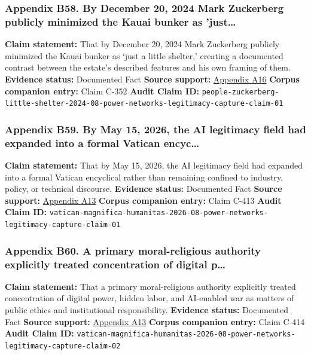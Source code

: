 \documentclass[
  american,
  11pt,
  letterpaper,
]{article}
\begin{document}
\subsubsection{Appendix B58. By December 20, 2024 Mark Zuckerberg
publicly minimized the Kauai bunker as
'just\ldots{}}\label{ch-08-appendix-b58-by-december-20-2024-mark-zuckerberg-publicly-minimized-the-kauai-bunker-as-just}

\textbf{Claim statement:} That by December 20, 2024 Mark Zuckerberg
publicly minimized the Kauai bunker as `just a little shelter,' creating
a documented contrast between the estate's described features and his
own framing of them. \textbf{Evidence status:} Documented Fact
\textbf{Source support:}
\hyperref[ch-08-appendix-a16-mark-zuckerberg-downplays-his-5-000-square-foot-underground-bunker-in-hawaii-just-a-little-shelter]{Appendix
A16} \textbf{Corpus companion entry:} Claim C-352 \textbf{Audit Claim
ID:}
\texttt{people-zuckerberg-little-shelter-2024-08-power-networks-legitimacy-capture-claim-01}

\subsubsection{Appendix B59. By May 15, 2026, the AI legitimacy field
had expanded into a formal Vatican
encyc\ldots{}}\label{ch-08-appendix-b59-by-may-15-2026-the-ai-legitimacy-field-had-expanded-into-a-formal-vatican-encyc}

\textbf{Claim statement:} That by May 15, 2026, the AI legitimacy field
had expanded into a formal Vatican encyclical rather than remaining
confined to industry, policy, or technical discourse. \textbf{Evidence
status:} Documented Fact \textbf{Source support:}
\hyperref[ch-08-appendix-a13-encyclical-letter-of-his-holiness-leo-xiv-magnifica-humanitas]{Appendix
A13} \textbf{Corpus companion entry:} Claim C-413 \textbf{Audit Claim
ID:}
\texttt{vatican-magnifica-humanitas-2026-08-power-networks-legitimacy-capture-claim-01}

\subsubsection{Appendix B60. A primary moral-religious authority
explicitly treated concentration of digital
p\ldots{}}\label{ch-08-appendix-b60-a-primary-moral-religious-authority-explicitly-treated-concentration-of-digital-p}

\textbf{Claim statement:} That a primary moral-religious authority
explicitly treated concentration of digital power, hidden labor, and
AI-enabled war as matters of public ethics and institutional
responsibility. \textbf{Evidence status:} Documented Fact \textbf{Source
support:}
\hyperref[ch-08-appendix-a13-encyclical-letter-of-his-holiness-leo-xiv-magnifica-humanitas]{Appendix
A13} \textbf{Corpus companion entry:} Claim C-414 \textbf{Audit Claim
ID:}
\texttt{vatican-magnifica-humanitas-2026-08-power-networks-legitimacy-capture-claim-02}
\end{document}
